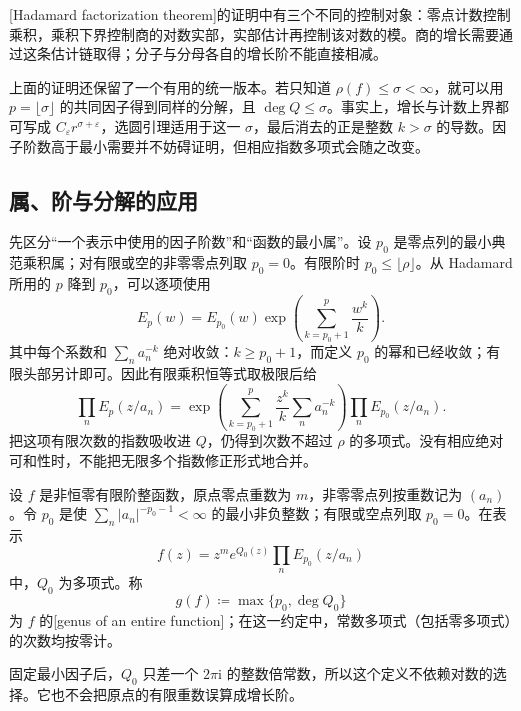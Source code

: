 [Hadamard factorization theorem]的证明中有三个不同的控制对象：零点计数控制乘积，乘积下界控制商的对数实部，实部估计再控制该对数的模。商的增长需要通过这条估计链取得；分子与分母各自的增长阶不能直接相减。

\ProseParagraphBreak

上面的证明还保留了一个有用的统一版本。若只知道 \(\rho(f)\le\sigma<\infty\)，就可以用 \(p=\lfloor\sigma\rfloor\) 的共同因子得到同样的分解，且 \(\deg Q\le\sigma\)。事实上，增长与计数上界都可写成 \(C_\varepsilon r^{\sigma+\varepsilon}\)，选圆引理适用于这一 \(\sigma\)，最后消去的正是整数 \(k>\sigma\) 的导数。因子阶数高于最小需要并不妨碍证明，但相应指数多项式会随之改变。

\subsection{属、阶与分解的应用}
\label{b3:subsec:200504}

先区分“一个表示中使用的因子阶数”和“函数的最小属”。设 \(p_0\) 是零点列的最小典范乘积属；对有限或空的非零零点列取 \(p_0=0\)。有限阶时 \(p_0\le\lfloor\rho\rfloor\)。从 Hadamard 所用的 \(p\) 降到 \(p_0\)，可以逐项使用
\[
 E_p(w)=E_{p_0}(w)
       \exp\left(\sum_{k=p_0+1}^{p}\frac{w^k}{k}\right).
\]
其中每个系数和 \(\sum_n a_n^{-k}\) 绝对收敛：\(k\ge p_0+1\)，而定义 \(p_0\) 的幂和已经收敛；有限头部另计即可。因此有限乘积恒等式取极限后给
\begin{equation}\label{b3:eq:20-genus-change}
 \prod_nE_p(z/a_n)
 =\exp\left(\sum_{k=p_0+1}^{p}\frac{z^k}{k}
                       \sum_n a_n^{-k}\right)
      \prod_nE_{p_0}(z/a_n).
\end{equation}
把这项有限次数的指数吸收进 \(Q\)，仍得到次数不超过 \(\rho\) 的多项式。没有相应绝对可和性时，不能把无限多个指数修正形式地合并。

\begin{definition}[有限阶整函数的属]\label{b3:def:20-entire-genus}
设 \(f\) 是非恒零有限阶整函数，原点零点重数为 \(m\)，非零零点列按重数记为 \((a_n)\)。令 \(p_0\) 是使 \(\sum_n|a_n|^{-p_0-1}<\infty\) 的最小非负整数；有限或空点列取 \(p_0=0\)。在表示
\[
 f(z)=z^m e^{Q_0(z)}\prod_nE_{p_0}(z/a_n)
\]
中，\(Q_0\) 为多项式。称
\[
 g(f)\coloneqq\max\{p_0,\deg Q_0\}
\]
为 \(f\) 的[genus of an entire function]；在这一约定中，常数多项式（包括零多项式）的次数均按零计。
\end{definition}

固定最小因子后，\(Q_0\) 只差一个 \(2\pi\mathrm{i}\) 的整数倍常数，所以这个定义不依赖对数的选择。它也不会把原点的有限重数误算成增长阶。

